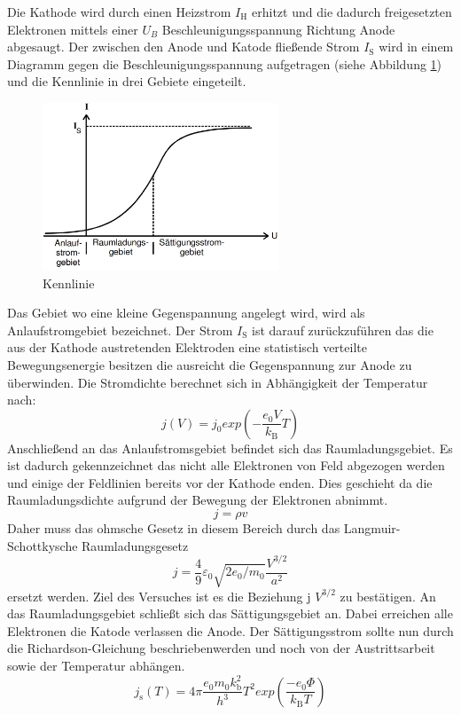Die Kathode wird durch einen Heizstrom $I_\text{H}$ erhitzt und die dadurch freigesetzten Elektronen mittels einer $U_B$ Beschleunigungsspannung Richtung Anode abgesaugt. Der zwischen den Anode und Katode fließende Strom $I_\text{S}$ wird in einem Diagramm gegen die Beschleunigungsspannung aufgetragen (siehe Abbildung \ref{fig:Ken}) und die Kennlinie in drei Gebiete eingeteilt.
\begin{figure}
  \centering
  \includegraphics[height=5cm]{picture/Kennlinie.png}
  \caption{Kennlinie \cite{pra}}
  \label{fig:Ken}
\end{figure}
Das Gebiet wo eine kleine Gegenspannung angelegt wird, wird als Anlaufstromgebiet bezeichnet. Der Strom $I_\text{S}$ ist darauf zurückzuführen das die aus der Kathode austretenden Elektroden eine statistisch verteilte Bewegungsenergie besitzen die ausreicht die Gegenspannung zur Anode zu überwinden. Die Stromdichte berechnet sich in Abhängigkeit der Temperatur nach:
\begin{equation}
  j(V) = j_0 exp\left( - \frac{e_0 V}{k_\text{B}}T \right)
  \label{eqn:jv}
\end{equation}
Anschließend an das Anlaufstromsgebiet befindet sich das Raumladungsgebiet. Es ist dadurch gekennzeichnet das nicht alle Elektronen von Feld abgezogen werden und einige der Feldlinien bereits vor der Kathode enden. Dies geschieht da die Raumladungsdichte aufgrund der Bewegung der Elektronen abnimmt. 
\begin{equation}
  j = \rho v
  \label{eqn:j}
\end{equation}
Daher muss das ohmsche Gesetz in diesem Bereich durch das Langmuir-Schottkysche Raumladungsgesetz 
\begin{equation}
  j = \frac{4}{9}\varepsilon_0\sqrt{2e_0/m_0}\frac{V^{3/2}}{a^2}
  \label{eqn:jLS}
\end{equation}
ersetzt werden. Ziel des Versuches ist es die Beziehung j \propto $V^{3/2}$ zu bestätigen.
An das Raumladungsgebiet schließt sich das Sättigungsgebiet an. Dabei erreichen alle  Elektronen die Katode verlassen die Anode. Der Sättigungsstrom sollte nun durch die Richardson-Gleichung beschriebenwerden und  noch von der Austrittsarbeit sowie der Temperatur abhängen.
\begin{equation}
  j_\text{s} (T) = 4 \pi \frac{e_0 m_0 k_\text{b}^2}{h^3} T^2 exp \left( \frac{-e_0 \Phi}{k_\text{B} T} \right)
  \label{eqn:js}
\end{equation}
